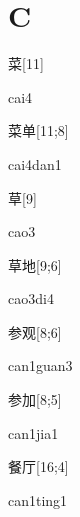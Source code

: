 ﻿%
\section*{C}

\begin{verbete}[cai4]{菜}[11]
\begin{pronuncia}{cai4}
\end{pronuncia}
\end{verbete}

\begin{verbete}{菜单}[11;8]
\begin{pronuncia}{cai4dan1}
\end{pronuncia}
\end{verbete}

\begin{verbete}[cao3]{草}[9]
\begin{pronuncia}{cao3}
\end{pronuncia}
\end{verbete}

\begin{verbete}[cao3di4]{草地}[9;6]
\begin{pronuncia}{cao3di4}
\end{pronuncia}
\end{verbete}

\begin{verbete}{参观}[8;6]
\begin{pronuncia}{can1guan3}
\end{pronuncia}
\end{verbete}

\begin{verbete}{参加}[8;5]
\begin{pronuncia}{can1jia1}
\end{pronuncia}
\end{verbete}

\begin{verbete}{餐厅}[16;4]
\begin{pronuncia}{can1ting1}
\end{pronuncia}
\end{verbete}

